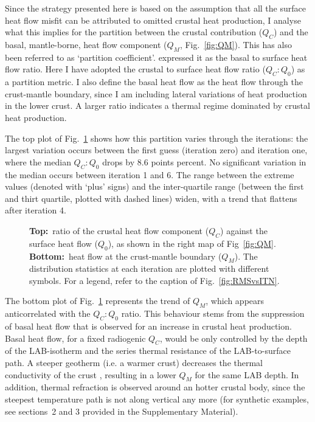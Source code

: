 Since the strategy presented here is based on the assumption that all the surface heat flow misfit can be attributed to omitted crustal heat production, I analyse what this implies for the partition between the crustal contribution ($Q_C$) and the basal, mantle-borne, heat flow component ($Q_M$, Fig.~\ref{fig:QM}).
This has also been referred to as `partition coefficient'. \textcite{Hasterok2016} expressed it as the basal to surface heat flow ratio.
Here I have adopted the crustal to surface heat flow ratio ($Q_C:Q_0$) as a partition metric.
I also define the basal heat flow as the heat flow through the crust-mantle boundary, since I am including lateral variations of heat production in the lower crust.
A larger ratio indicates a thermal regime dominated by crustal heat production.

The top plot of Fig.~\ref{fig:QMvsITN} shows how this partition varies through the iterations: the largest variation occurs between the first guess (iteration zero) and iteration one, where the median $Q_C:Q_0$ drops by $8.6$ points percent.
No significant variation in the median occurs between iteration 1 and 6.
The range between the extreme values (denoted with `plus' signs) and the inter-quartile range (between the first and thirt quartile, plotted with dashed lines) widen, with a trend that flattens after iteration 4.

\begin{figure}
	\begin{adjustbox}{center}
	\end{adjustbox}
	\caption[Partition ratio and heat flow at the crust-mantle boundary.]{\textbf{Top:}~ratio of the crustal heat flow component ($Q_C$) against the surface heat flow ($Q_0$), as shown in the right map of Fig~\ref{fig:QM}. \textbf{Bottom:}~heat flow at the crust-mantle boundary ($Q_M$). The distribution statistics at each iteration are plotted with different symbols. For a legend, refer to the caption of Fig.~\ref{fig:RMSvsITN}.}
	\label{fig:QMvsITN}
\end{figure}

The bottom plot of Fig.~\ref{fig:QMvsITN} represents the trend of $Q_M$, which appears anticorrelated with the ${Q_C:Q_0}$ ratio.
This behaviour stems from the suppression of basal heat flow that is observed for an increase in crustal heat production.
Basal heat flow, for a fixed radiogenic $Q_C$, would be only controlled by the depth of the LAB-isotherm and the series thermal resistance of the LAB-to-surface path.
A steeper geotherm (i.e. a warmer crust) decreases the thermal conductivity of the crust \parencite[see Eq.~\ref{eq:kTzChap86} here and ][]{Chapman1986}, resulting in a lower $Q_M$ for the same LAB depth.
In addition, thermal refraction is observed around an hotter crustal body, since the steepest temperature path is not along vertical any more (for synthetic examples, see sections~2 and 3 provided in the Supplementary Material).

